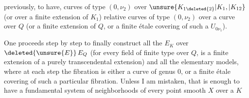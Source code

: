 previously, to have,  curves of type $(0,\nu_2)$ over $\unsure{K_{1\deleted{2}}|K_1,|K_{12}}$ (or over a finite extension of $K_1$)  relative curves of type $(0,\nu_2)$ over a curve over $Q$  (or a finite extension of $Q$, or a finite  étale covering of such a $U_{0\nu_1}$).

One proceeds step by step to finally construct all the $E_K$ over $\deleted{\unsure{E}}\,E_Q$ (for every field  of finite type over $Q$, is a finite extension of a purely transcendental extension) and all the elementary models, where at each step the fibration is either a curve of genus $0$, or a finite étale covering of such a particular fibration. Unless I am mistaken, that is enough to have a fundamental system of neighborhoods of every point  smooth $X$ over a $K$
